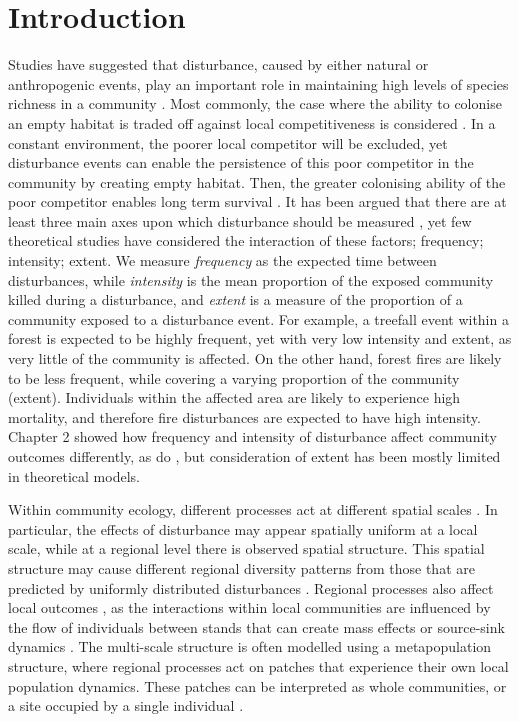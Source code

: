 \section{Introduction}
Studies have suggested that disturbance, caused by either natural or anthropogenic events, play an important role in maintaining high levels of species richness in a community \citep{connell1978diversity,huston1979general,sousa1984role,schoener1974resource}. Most commonly, the case where the ability to colonise an empty habitat is traded off against local competitiveness is considered \citep[e.g.][]{tilman1994competition, cadotte2006testing}. In a constant environment, the poorer local competitor will be excluded, yet disturbance events can enable the persistence of this poor competitor in the community by creating empty habitat. Then, the greater colonising ability of the poor competitor enables long term survival \citep{sousa1984role,denslow1987tropical,connell1978diversity,grime1973competitive,huston1979general}. It has been argued that there are at least three main axes upon which disturbance should be measured \citep{malanson1984intensity,miller1982community,sousa1984role}, yet few theoretical studies have considered the interaction of these factors; frequency; intensity; extent. We measure \emph{frequency} as the expected time between disturbances, while \emph{intensity} is the mean proportion of the exposed community killed during a disturbance, and \emph{extent} is a measure of the proportion of a community exposed to a disturbance event. For example, a treefall event within a forest is expected to be highly frequent, yet with very low intensity and extent, as very little of the community is affected. On the other hand, forest fires are likely to be less frequent, while covering a varying proportion of the community (extent). Individuals within the affected area are likely to experience high mortality, and therefore fire disturbances are expected to have high intensity. Chapter 2 showed how  frequency and intensity of disturbance affect community outcomes differently, as do \cite{miller2011frequency}, but consideration of extent has been mostly limited in theoretical models.

Within community ecology, different processes act at different spatial scales \citep{levin1992problem}. In particular, the effects of disturbance may appear spatially uniform at a local scale, while at a regional level there is observed spatial structure. This spatial structure may cause different regional diversity patterns from those that are predicted by uniformly distributed disturbances \citep{vuilleumier2007patch}. Regional processes also affect local outcomes \citep{holt1993ecology}, as the interactions within local communities are influenced by the flow of individuals between stands that can create mass effects \citep{shmida1985biological} or source-sink dynamics \citep{pulliam1988sources}. The multi-scale structure is often modelled using a metapopulation structure, where regional processes act on patches that experience their own local population dynamics. These patches can be interpreted as whole communities, or a site occupied by a single individual \cite{tilman1994competition,calcagno2006coexistence}.


